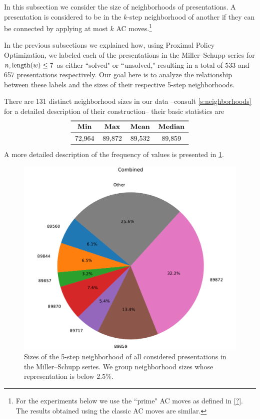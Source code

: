 
In this subsection we consider the size of neighborhoods of presentations.
A presentation is considered to be in the $k$-step neighborhood of another if they can be connected by applying at most $k$ AC moves.\footnote{For the experiments below we use the ``prime" AC moves as defined in \cref{?}. The results obtained using the classic AC moves are similar.}

In the previous subsections we explained how, using Proximal Policy Optimization, we labeled each of the presentations in the Miller–Schupp series for $n, \operatorname{length}(w) \leq 7$ as either ``solved" or ``unsolved," resulting in a total of 533 and 657 presentations respectively.
Our goal here is to analyze the relationship between these labels and the sizes of their respective 5-step neighborhoods.

There are 131 distinct neighborhood sizes in our data --consult \cref{s:neighborhoods} for a detailed description of their construction-- their basic statistics are
\[
\begin{tabular}{cccccc}
	\toprule
	\textbf{Min} & \textbf{Max} & \textbf{Mean} & \textbf{Median} \\
	\midrule
	72,964 & 89,872 & 89,532 & 89,859 \\
	\bottomrule
\end{tabular}
\]
A more detailed description of the frequency of values is presented in \cref{fig:prime_combined_pie}.

\begin{figure}
	\includegraphics[scale=.4]{fig/prime_combined_pie_cropped.pdf}
	\caption{Sizes of the 5-step neighborhood of all considered presentations in the Miller–Schupp series. We group neighborhood sizes whose representation is below 2.5\%.}
	\label{fig:prime_combined_pie}
\end{figure}

